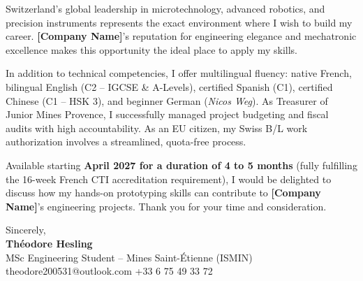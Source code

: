 \documentclass[10.5pt,a4paper]{article}
\begin{document}
Switzerland's global leadership in microtechnology, advanced robotics, and precision instruments represents the exact environment where I wish to build my career. \textbf{[Company Name]}'s reputation for engineering elegance and mechatronic excellence makes this opportunity the ideal place to apply my skills.

In addition to technical competencies, I offer multilingual fluency: native French, bilingual English (C2 -- IGCSE \& A-Levels), certified Spanish (C1), certified Chinese (C1 -- HSK 3), and beginner German (\textit{Nicos Weg}). As Treasurer of Junior Mines Provence, I successfully managed project budgeting and fiscal audits with high accountability. As an EU citizen, my Swiss B/L work authorization involves a streamlined, quota-free process.

Available starting \textbf{April 2027 for a duration of 4 to 5 months} (fully fulfilling the 16-week French CTI accreditation requirement), I would be delighted to discuss how my hands-on prototyping skills can contribute to \textbf{[Company Name]}'s engineering projects. Thank you for your time and consideration.

\vspace{14pt}
\noindent Sincerely,\\[18pt]
\textbf{Théodore Hesling}\\[2pt]
{\small MSc Engineering Student -- Mines Saint-Étienne (ISMIN)\\
theodore200531@outlook.com \quad +33 6 75 49 33 72}
\end{document}
